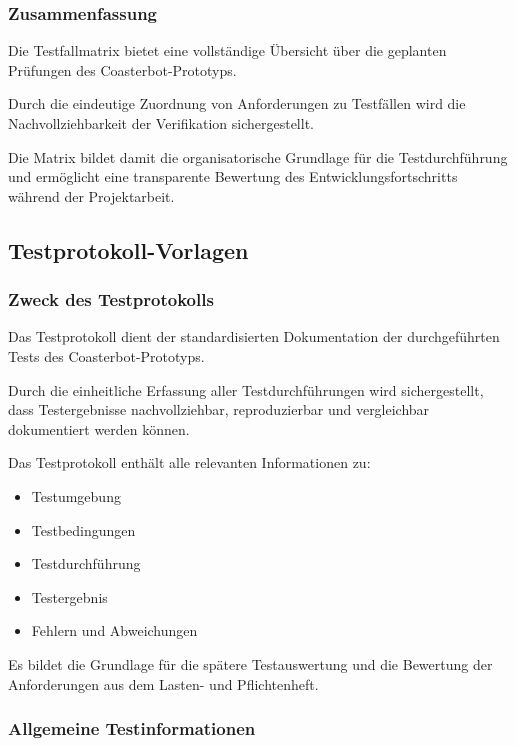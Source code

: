 \subsubsection{Zusammenfassung}\label{zusammenfassung-3}

Die Testfallmatrix bietet eine vollständige Übersicht über die geplanten
Prüfungen des Coasterbot-Prototyps.

Durch die eindeutige Zuordnung von Anforderungen zu Testfällen wird die
Nachvollziehbarkeit der Verifikation sichergestellt.

Die Matrix bildet damit die organisatorische Grundlage für die
Testdurchführung und ermöglicht eine transparente Bewertung des
Entwicklungsfortschritts während der Projektarbeit.

\subsection{Testprotokoll-Vorlagen}\label{testprotokoll-vorlagen}

\subsubsection{Zweck des Testprotokolls}\label{zweck-des-testprotokolls}

Das Testprotokoll dient der standardisierten Dokumentation der
durchgeführten Tests des Coasterbot-Prototyps.

Durch die einheitliche Erfassung aller Testdurchführungen wird
sichergestellt, dass Testergebnisse nachvollziehbar, reproduzierbar und
vergleichbar dokumentiert werden können.

Das Testprotokoll enthält alle relevanten Informationen zu:

\begin{itemize}
\tightlist
\item
  Testumgebung
\item
  Testbedingungen
\item
  Testdurchführung
\item
  Testergebnis
\item
  Fehlern und Abweichungen
\end{itemize}

Es bildet die Grundlage für die spätere Testauswertung und die Bewertung
der Anforderungen aus dem Lasten- und Pflichtenheft.

\subsubsection{Allgemeine
Testinformationen}\label{allgemeine-testinformationen}

